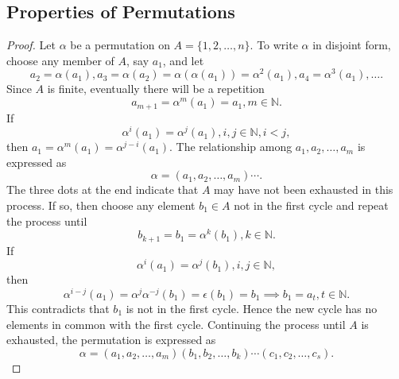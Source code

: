 \documentclass{article}
\newtheorem{theorem}{Theorem}[section]
\theoremstyle{definition}
\begin{document}
 \subsection{Properties of Permutations}
 
 \begin{proof}
     Let $\alpha$ be a permutation on $A = \{1,2,\dots,n\}$. To write $\alpha$ in disjoint form, choose any member of $A$, say $a_1$, and let
     \begin{equation*}
         a_2 = \alpha(a_1), a_3 = \alpha(a_2) = \alpha(\alpha(a_1)) = \alpha^2(a_1), a_4 = \alpha^3(a_1), \dots.
     \end{equation*}
     Since $A$ is finite, eventually there will be a repetition 
     \begin{equation*}
         a_{m+1} = \alpha^m(a_1) = a_1, m \in \mathbb{N}.
     \end{equation*}
     If 
     \begin{equation*}
         \alpha^i(a_1) = \alpha^j(a_1), i,j \in \mathbb{N},i<j,
     \end{equation*}
     then $a_1 = \alpha^m(a_1) = \alpha^{j-i}(a_1)$. The relationship among $a_1,a_2,\dots,a_m$ is expressed as
     \begin{equation*}
         \alpha = (a_1,a_2,\dots,a_m)\cdots.
     \end{equation*}
     The three dots at the end indicate that $A$ may have not been exhausted in this process. If so, then choose any element $b_1 \in A$ not in the first cycle and repeat the process until 
     \begin{equation*}
         b_{k+1} = b_1 = \alpha^k(b_1), k \in \mathbb{N}.
     \end{equation*}
     If 
     \begin{equation*}
         \alpha^i(a_1)=\alpha^j(b_1), i,j \in \mathbb{N},
     \end{equation*}
     then 
     \begin{equation*}
         \alpha^{i-j}(a_1)=\alpha^j\alpha^{-j}(b_1) = \epsilon(b_1) = b_1 \implies b_1 = a_t, t \in \mathbb{N}.
     \end{equation*}
     This contradicts that $b_1$ is not in the first cycle. Hence the new cycle has no elements in common with the first cycle. Continuing the process until $A$ is exhausted, the permutation is expressed as
     \begin{equation*}
         \alpha = (a_1,a_2,\dots,a_m)(b_1,b_2,\dots,b_k)\cdots(c_1,c_2,\dots,c_s).
     \end{equation*}
 \end{proof}
 
\end{document}
